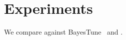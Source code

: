 \documentclass{article}
\begin{document}
\section{Experiments}\label{sec:exp}
We compare against BayesTune~\citep{bayestune} and \citep{k1}.


\end{document}
